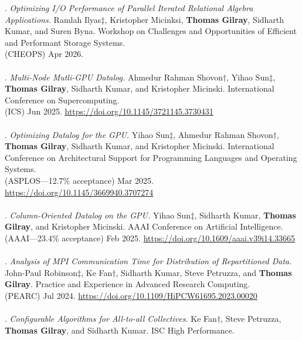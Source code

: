 \paper. \textit{Optimizing I/O Performance of Parallel Iterated Relational Algebra Applications.}
Ramlah Ilyas$\ddagger$, Kristopher Micinksi, \textbf{Thomas Gilray}, Sidharth Kumar, and Suren Byna.
Workshop on Challenges and Opportunities of Efficient and Performant Storage Systems.
\\(CHEOPS) Apr 2026.
\\ \vspace{-0.1cm}\\
\paper. \textit{Multi-Node Mutli-GPU Datalog.}
Ahmedur Rahman Shovon$\dagger$, Yihao Sun$\ddagger$, \textbf{Thomas Gilray}, Sidharth Kumar, and Kristopher Micinski.
International Conference on Supercomputing.
\\(ICS) Jun 2025. \url{https://doi.org/10.1145/3721145.3730431}
\\ \vspace{-0.1cm}\\
\paper. \textit{Optimizing Datalog for the GPU.}
Yihao Sun$\ddagger$, Ahmedur Rahman Shovon$\dagger$, \textbf{Thomas Gilray}, Sidharth Kumar, and Kristopher Micinski.
International Conference on Architectural Support for Programming Languages and Operating Systems.
\\(ASPLOS---12.7\% acceptance) Mar 2025. \url{https://doi.org/10.1145/3669940.3707274}
\\ \vspace{-0.1cm}\\
\paper. \textit{Column-Oriented Datalog on the GPU.}
Yihao Sun$\ddagger$, Sidharth Kumar, \textbf{Thomas Gilray}, and Kristopher Micinski.
AAAI Conference on Artificial Intelligence.
\\(AAAI---23.4\% acceptance) Feb 2025. \url{https://doi.org/10.1609/aaai.v39i14.33665}
\\ \vspace{-0.1cm}\\
\paper. \textit{Analysis of MPI Communication Time for Distribution of Repartitioned Data.}
John-Paul Robinson$\ddagger$, Ke Fan$\dagger$, Sidharth Kumar, Steve Petruzza, and \textbf{Thomas Gilray}.
Practice and Experience in Advanced Research Computing.
\\(PEARC) Jul 2024. \url{https://doi.org/10.1109/HiPCW61695.2023.00020}
\\ \vspace{-0.1cm}\\
\paper. \textit{Configurable Algorithms for All-to-all Collectives.}
Ke Fan$\dagger$, Steve Petruzza, \textbf{Thomas Gilray}, and Sidharth Kumar.
ISC High Performance.
